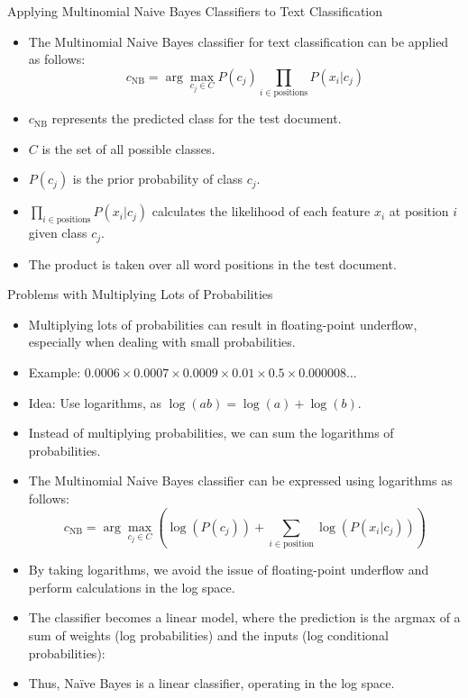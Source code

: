 \documentclass[handout]{beamer}
\begin{document}
\begin{frame}{Applying Multinomial Naive Bayes Classifiers to Text Classification}
\scriptsize
\begin{itemize}
    \item The Multinomial Naive Bayes classifier for text classification can be applied as follows:
    \[
    c_{\text{NB}} = \arg\max_{c_j \in C} P(c_j) \prod_{i \in \text{positions}} P(x_i | c_j)
    \]
    \item $c_{\text{NB}}$ represents the predicted class for the test document.
    \item $C$ is the set of all possible classes.
    \item $P(c_j)$ is the prior probability of class $c_j$.
    \item $\prod_{i \in \text{positions}} P(x_i | c_j)$ calculates the likelihood of each feature $x_i$ at position $i$ given class $c_j$.
    \item The product is taken over all word positions in the test document.
\end{itemize}
\end{frame}

\begin{frame}{Problems with Multiplying Lots of Probabilities}
\scriptsize
\begin{itemize}
    \item Multiplying lots of probabilities can result in floating-point underflow, especially when dealing with small probabilities.
    \item Example: $0.0006 \times 0.0007 \times 0.0009 \times 0.01 \times 0.5 \times 0.000008 \ldots$
    \item Idea: Use logarithms, as $\log(ab) = \log(a) + \log(b)$.
    \item Instead of multiplying probabilities, we can sum the logarithms of probabilities.
    \item The Multinomial Naive Bayes classifier can be expressed using logarithms as follows:
    \[
    c_{\text{NB}} = \arg\max_{c_j \in C} \left(\log(P(c_j)) + \sum_{i \in \text{position}} \log(P(x_i | c_j))\right)
    \]
    \item By taking logarithms, we avoid the issue of floating-point underflow and perform calculations in the log space.
     \item The classifier becomes a linear model, where the prediction is the argmax of a sum of weights (log probabilities) and the inputs (log conditional probabilities):
    \item Thus, Naïve Bayes is a linear classifier, operating in the log space.
    
    
\end{itemize}
\end{frame}
\end{document}
